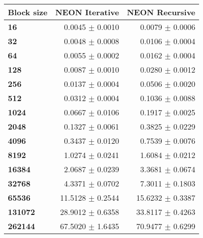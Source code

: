 \begin{tabular}{lrr}\toprule
\textbf{Block size}  & \textbf{NEON Iterative} & \textbf{NEON Recursive} \\\midrule
\textbf{16}  & 0.0045 $\pm$ 0.0010 & 0.0079 $\pm$ 0.0006 \\
\textbf{32}  & 0.0048 $\pm$ 0.0008 & 0.0106 $\pm$ 0.0004 \\
\textbf{64}  & 0.0055 $\pm$ 0.0002 & 0.0162 $\pm$ 0.0004 \\
\textbf{128}  & 0.0087 $\pm$ 0.0010 & 0.0280 $\pm$ 0.0012 \\
\textbf{256}  & 0.0137 $\pm$ 0.0004 & 0.0506 $\pm$ 0.0020 \\
\textbf{512}  & 0.0312 $\pm$ 0.0004 & 0.1036 $\pm$ 0.0088 \\
\textbf{1024}  & 0.0667 $\pm$ 0.0106 & 0.1917 $\pm$ 0.0025 \\
\textbf{2048}  & 0.1327 $\pm$ 0.0061 & 0.3825 $\pm$ 0.0229 \\
\textbf{4096}  & 0.3437 $\pm$ 0.0120 & 0.7539 $\pm$ 0.0076 \\
\textbf{8192}  & 1.0274 $\pm$ 0.0241 & 1.6084 $\pm$ 0.0212 \\
\textbf{16384}  & 2.0687 $\pm$ 0.0239 & 3.3681 $\pm$ 0.0674 \\
\textbf{32768}  & 4.3371 $\pm$ 0.0702 & 7.3011 $\pm$ 0.1803 \\
\textbf{65536}  & 11.5128 $\pm$ 0.2544 & 15.6232 $\pm$ 0.3387 \\
\textbf{131072}  & 28.9012 $\pm$ 0.6358 & 33.8117 $\pm$ 0.4263 \\
\textbf{262144} & 67.5020 $\pm$ 1.6435 & 70.9477 $\pm$ 0.6299 \\
\bottomrule
\end{tabular}
